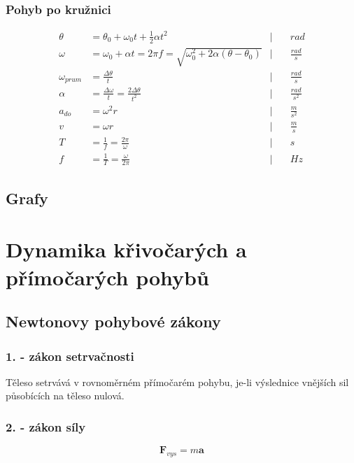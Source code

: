 \documentclass[titlepage]{report}
\begin{document}
\subsection{Pohyb po kružnici}
\begin{align}
\theta &= \theta_0 + \omega_0t+\frac{1}{2}\alpha t^2                                     &  \Big| \quad &rad\\
\omega &= \omega_0 + \alpha t = 2 \pi f  = \sqrt{\omega_0^2 + 2\alpha(\theta-\theta_0)}  &  \Big| \quad &\frac{rad}{s}\\
\omega_{prum} &= \frac{\Delta \theta}{t}                                                 &  \Big| \quad &\frac{rad}{s}\\
\alpha &= \frac{\Delta \omega}{t} = \frac{2\Delta \theta}{t^2}                           &  \Big| \quad &\frac{rad}{s^2}\\
a_{do} &= \omega^2r                                                                      &  \Big| \quad &\frac{m}{s^2}\\
v &= \omega r                                                                            &  \Big| \quad &\frac{m}{s}\\
T &= \frac{1}{f} = \frac{2\pi}{\omega}                                                   &  \Big| \quad &s\\
f &= \frac{1}{T} = \frac{\omega}{2\pi}                                                   &  \Big| \quad &Hz
\end{align}
\section{Grafy}
\chapter{Dynamika křivočarých a přímočarých pohybů}
\section{Newtonovy pohybové zákony}
\subsection{1. - zákon setrvačnosti}
Těleso setrvává v rovnoměrném přímočarém pohybu, je-li výslednice vnějších sil působících na těleso nulová.
\subsection{2. - zákon síly}
\begin{equation}
\boldsymbol F_{vys} = m\boldsymbol a
\end{equation}
\end{document}
